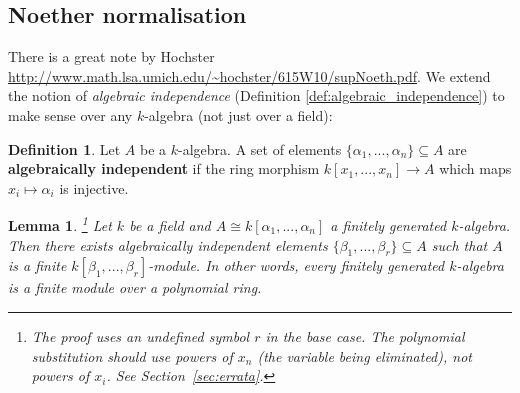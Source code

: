 \documentclass[12pt]{article}
\theoremstyle{plain}
\newtheorem{lemma}[thm]{Lemma}
\theoremstyle{definition}
\newtheorem{defn}[thm]{Definition} %
\newcommand{\lto}{\longrightarrow}
\begin{document}
\subsection{Noether normalisation}
There is a great note by Hochster \url{http://www.math.lsa.umich.edu/~hochster/615W10/supNoeth.pdf}.
%
We extend the notion of \emph{algebraic independence} (Definition \ref{def:algebraic_independence}) to make sense over any $k$-algebra (not just over a field):
\begin{defn}
Let $A$ be a $k$-algebra. A set of elements $\lbrace \alpha_1,...,\alpha_n \rbrace \subseteq A$ are \textbf{algebraically independent} if the ring morphism $k[x_1,...,x_n] \lto A$ which maps $x_i \mapsto \alpha_i$ is injective.
\end{defn}
%
\begin{lemma}
\label{lem:noether_normalisation}\footnote{The proof uses an undefined symbol $r$ in the base case. The polynomial substitution should use powers of $x_n$ (the variable being eliminated), not powers of $x_i$. See Section~\ref{sec:errata}.}
Let $k$ be a field and $A\cong k[\alpha_1,...,\alpha_n]$ a finitely generated $k$-algebra. Then there exists algebraically independent elements $\lbrace \beta_1,...,\beta_r\rbrace \subseteq A$ such that $A$ is a finite $k[\beta_1,...,\beta_r]$-module. In other words, every finitely generated $k$-algebra is a finite module over a polynomial ring.
\end{lemma}
\end{document}
